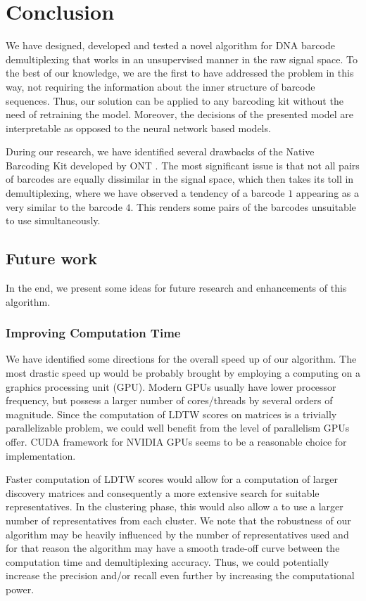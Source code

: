 \chapter*{Conclusion}  %

We have designed, developed and tested a novel algorithm for DNA barcode demultiplexing that works in an unsupervised manner in the raw signal space. To the best of our knowledge, we are the first to have addressed the problem in this way, not requiring the information about the inner structure of barcode sequences. Thus, our solution can be applied to any barcoding kit without the need of retraining the model. Moreover, the decisions of the presented model are interpretable as opposed to the neural network based models.

During our research, we have identified several drawbacks of the Native Barcoding Kit developed by ONT \cite{BarcodesONT}. The most significant issue is that not all pairs of barcodes are equally dissimilar in the signal space, which then takes its toll in demultiplexing, where we have observed a tendency of a barcode $1$ appearing as a very similar to the barcode $4$. This renders some pairs of the barcodes unsuitable to use simultaneously.

\section*{Future work}
In the end, we present some ideas for future research and enhancements of this algorithm.

\subsection*{Improving Computation Time}
We have identified some directions for the overall speed up of our algorithm. The most drastic speed up would be probably brought by employing a computing on a graphics processing unit (GPU). Modern GPUs usually have lower processor frequency, but possess a larger number of cores/threads by several orders of magnitude. Since the computation of LDTW scores on matrices is a trivially parallelizable problem, we could well benefit from the level of parallelism GPUs offer. CUDA framework \cite{CUDA} for NVIDIA GPUs seems to be a reasonable choice for implementation.

Faster computation of LDTW scores would allow for a computation of larger discovery matrices and consequently a more extensive search for suitable representatives. In the clustering phase, this would also allow a to use a larger number of representatives from each cluster. We note that the robustness of our algorithm may be heavily influenced by the number of representatives used and for that reason the algorithm may have a smooth trade-off curve between the computation time and demultiplexing accuracy. Thus, we could potentially increase the precision and/or recall even further by increasing the computational power.

